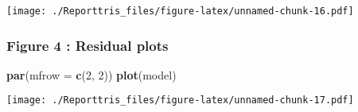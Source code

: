 \documentclass[a3paper]{article}
\newenvironment{Shaded}{\begin{snugshade}}{\end{snugshade}}
\newcommand{\KeywordTok}[1]{\textcolor[rgb]{0.13,0.29,0.53}{\textbf{{#1}}}}
\newcommand{\DataTypeTok}[1]{\textcolor[rgb]{0.13,0.29,0.53}{{#1}}}
\newcommand{\DecValTok}[1]{\textcolor[rgb]{0.00,0.00,0.81}{{#1}}}
\newcommand{\StringTok}[1]{\textcolor[rgb]{0.31,0.60,0.02}{{#1}}}
\newcommand{\NormalTok}[1]{{#1}}
\begin{document}
\begin{Shaded}
\end{Shaded}

\texttt{[image: ./Reporttris\_files/figure-latex/unnamed-chunk-16.pdf]}

\subsubsection{Figure 4 : Residual plots}\label{figure-4-residual-plots}

\begin{Shaded}
\begin{Highlighting}[]
\KeywordTok{par}\NormalTok{(}\DataTypeTok{mfrow =} \KeywordTok{c}\NormalTok{(}\DecValTok{2}\NormalTok{, }\DecValTok{2}\NormalTok{))}
\KeywordTok{plot}\NormalTok{(model)}
\end{Highlighting}
\end{Shaded}

\texttt{[image: ./Reporttris\_files/figure-latex/unnamed-chunk-17.pdf]}
\end{document}
